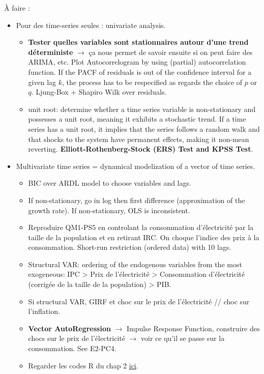 
À faire : 
\begin{itemize}
\item Pour des time-series seules : univariate analysis.
    \begin{itemize}
        \item \textbf{Tester quelles variables sont stationnaires autour d'une trend déterministe} $\to$ ça nous permet de savoir ensuite si on peut faire des ARIMA, etc. Plot Autocorrelogram by using (partial) autocorrelation function. If the PACF of residuals is out of the confidence interval for a given lag $k$, the process has to be respecified as regards the choice of $p$ or $q$. Ljung-Box + Shapiro Wilk over residuals.
        \item unit root: determine whether a time series variable is non-stationary and possesses a unit root, meaning it exhibits a stochastic trend. If a time series has a unit root, it implies that the series follows a random walk and that shocks to the system have permanent effects, making it non-mean reverting. \textbf{Elliott-Rothenberg-Stock (ERS) Test and KPSS Test}.
    \end{itemize}
\item Multivariate time series = dynamical modelization of a vector of
time series. 
\begin{itemize}
    \item BIC over ARDL model to choose variables and lags.
    \item If non-stationary, go in log then first difference (approximation of the growth rate). If non-stationary, OLS is inconsistent.
    \item Reproduire QM1-PS5 en controlant la consommation d'électricité par la taille de la population et en retirant IRC. On choque l'indice des prix à la consommation. Short-run restriction (ordered data) with 10 lags.
    \item Structural VAR: ordering of the endogenous variables from the most
    exogeneous: IPC > Prix de l'électricité > Consommation d'électricité (corrigée de la taille de la population) > PIB.
    \item Si structural VAR, GIRF et choc sur le prix de l'électricité // choc sur l'inflation.
    \item \textbf{Vector AutoRegression} $\to$ Impulse Response Function, construire des chocs sur le prix de l'électricité $\to$ voir ce qu'il se passe sur la consommation. See E2-PC4.
    \item Regarder les codes R du chap 2 \href{https://www.dropbox.com/scl/fo/5wj88417eeloxca22qk0b/ACA2WKJ9yp2t9NGVqWXIiks?dl=0&e=1&rlkey=yjyfxpotil48wx9hh4xkdiq68}{ici}.

\end{itemize}
\end{itemize}
